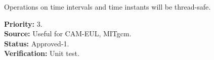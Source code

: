 Operations on time intervals and time instants will be thread-safe.
\begin{reqlist}
{\bf Priority:} 3. \\
{\bf Source:} Useful for CAM-EUL, MITgcm. \\
{\bf Status:} Approved-1. \\
{\bf Verification:} Unit test. 
\end{reqlist}
 















